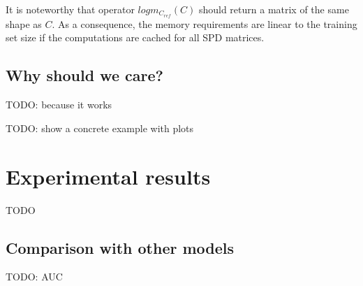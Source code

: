 \documentclass[a4paper,11pt]{report}
\begin{document}
It is noteworthy that operator $logm_{C_{ref}} (C)$ should return a matrix of the same shape as $C$.
As a consequence, the memory requirements are linear to the training set size if the computations
are cached for all SPD matrices.

\section{Why should we care?}

TODO: because it works

TODO: show a concrete example with plots

\chapter{Experimental results}

TODO

\section{Comparison with other models}

TODO: AUC


\newpage



\end{document}
